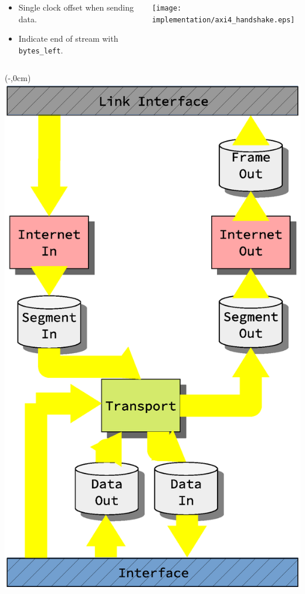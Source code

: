 \begin{frame}[fragile]
\begin{columns}
        \begin{column}{0.4\textwidth}
           \begin{itemize}
               \item Single clock offset when sending data.
               \item Indicate end of stream with \texttt{bytes\_left}.
           \end{itemize}
        \end{column}
        \begin{column}{0.5\textwidth}  %
            \texttt{[image: implementation/axi4\_handshake.eps]}
        \end{column}
    \end{columns}
\end{frame}


\begin{frame}[fragile]
    \begin{textblock*}{\displayThumbnail}(\paperwidth-\displayThumbnail-0.2cm,0cm) %
        \colorbox{white}{\includegraphics[width=\textwidth]{implementation/design_2_busses.eps}}

\end{textblock*}
\end{frame}
